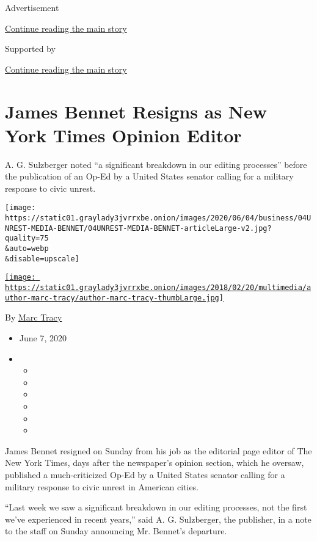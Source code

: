 Advertisement

\protect\hyperlink{after-top}{Continue reading the main story}

Supported by

\protect\hyperlink{after-sponsor}{Continue reading the main story}

\hypertarget{james-bennet-resigns-as-new-york-times-opinion-editor}{%
\section{James Bennet Resigns as New York Times Opinion
Editor}\label{james-bennet-resigns-as-new-york-times-opinion-editor}}

A. G. Sulzberger noted ``a significant breakdown in our editing
processes'' before the publication of an Op-Ed by a United States
senator calling for a military response to civic unrest.

\texttt{[image: https://static01.graylady3jvrrxbe.onion/images/2020/06/04/business/04UNREST-MEDIA-BENNET/04UNREST-MEDIA-BENNET-articleLarge-v2.jpg?quality=75\\\&auto=webp\\\&disable=upscale]}

\href{https://www.nytimes3xbfgragh.onion/by/marc-tracy}{\texttt{[image: https://static01.graylady3jvrrxbe.onion/images/2018/02/20/multimedia/author-marc-tracy/author-marc-tracy-thumbLarge.jpg]}}

By \href{https://www.nytimes3xbfgragh.onion/by/marc-tracy}{Marc Tracy}

\begin{itemize}
\item
  June 7, 2020
\item
  \begin{itemize}
  \item
  \item
  \item
  \item
  \item
  \item
  \end{itemize}
\end{itemize}

James Bennet resigned on Sunday from his job as the editorial page
editor of The New York Times, days after the newspaper's opinion
section, which he oversaw, published a much-criticized Op-Ed by a United
States senator calling for a military response to civic unrest in
American cities.

``Last week we saw a significant breakdown in our editing processes, not
the first we've experienced in recent years,'' said A. G. Sulzberger,
the publisher, in a note to the staff on Sunday announcing Mr. Bennet's
departure.

